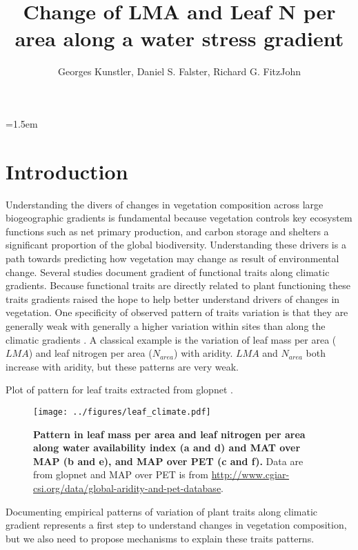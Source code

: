 \documentclass[a4paper,11pt]{article}
\title{Change of LMA and Leaf N per area along a water stress gradient}
\author{Georges Kunstler, Daniel S. Falster, Richard G. FitzJohn}
\date{}
\affiliation{Irstea, Grenoble, France and Department of Biological Sciences, Macquarie University,
  Sydney, Australia}
\date{}
\begin{document}
\mstitleshort
\parindent=1.5em
\addtolength{\parskip}{.3em}


\section{Introduction}

Understanding the divers of changes in vegetation composition across large biogeographic gradients is fundamental because vegetation controls key ecosystem functions such as net primary production, and carbon storage and shelters a significant proportion of the global biodiversity. Understanding these drivers is a path towards predicting how vegetation may change as result of environmental change. Several studies document gradient of functional traits along climatic
gradients. Because functional traits are directly related to plant functioning these traits gradients raised the hope to help better understand drivers of changes in vegetation. One specificity of observed pattern of traits variation is
that they are generally weak with generally a higher variation within
sites than along the climatic gradients \citep[see][]{Wright-2004}. A
classical example is the variation of leaf mass per area ($LMA$) and
leaf nitrogen per area ($N_{area}$) with aridity. $LMA$
\citep{Wright-2004,Onoda-2011,Moles-2014} and $N_{area}$
\citep{Wright-2005,Maire-2015} both increase with aridity, but these
patterns are very weak.


Plot of pattern for leaf traits extracted from glopnet \citep{Wright-2004}.

\begin{figure}[ht]
\centering
\texttt{[image: ../figures/leaf\_climate.pdf]}
\caption{\textbf{Pattern in leaf mass per area and leaf nitrogen per area along water availability index (a and d) and MAT over MAP (b and e), and MAP over PET (c and f).} Data are from glopnet \citep{Wright-2004} and MAP over PET is from \url{http://www.cgiar-csi.org/data/global-aridity-and-pet-database}.
\label{fig:leafpattern}}
\end{figure}

Documenting empirical patterns of variation of plant traits along
climatic gradient represents a first step to understand changes in
vegetation composition, but we also need to propose mechanisms to
explain these traits patterns. 
\end{document}
